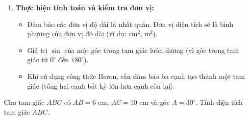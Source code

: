 \begin{phuongphap}
\begin{enumerate}
\begin{itemize}
        $S = pr$, với $p = \frac{a+b+c}{2}$.
    \end{itemize}
    \item \textbf{Thực hiện tính toán và kiểm tra đơn vị:}
    \begin{itemize}
        \item Đảm bảo các đơn vị độ dài là nhất quán. Đơn vị diện tích sẽ là bình phương của đơn vị độ dài (ví dụ: cm$^2$, m$^2$).
        \item Giá trị $\sin$ của một góc trong tam giác luôn dương (vì góc trong tam giác từ $0^\circ$ đến $180^\circ$).
        \item Khi sử dụng công thức Heron, cần đảm bảo ba cạnh tạo thành một tam giác (tổng hai cạnh bất kỳ lớn hơn cạnh còn lại).
    \end{itemize}
\end{enumerate}
\end{phuongphap}
\begin{vidumau}
Cho tam giác $ABC$ có $AB = 6$ cm, $AC = 10$ cm và góc $A = 30^\circ$. Tính diện tích tam giác $ABC$.
\end{vidumau}

